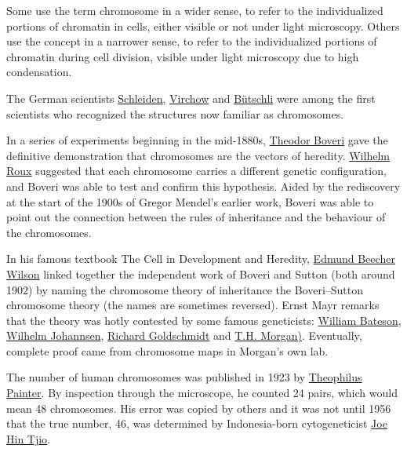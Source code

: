 Some use the term chromosome in a wider sense, to refer to the individualized portions of chromatin in cells, either visible or not under light microscopy. Others use the concept in a narrower sense, to refer to the individualized portions of chromatin during cell division, visible under light microscopy due to high condensation.

The German scientists \href{https://en.wikipedia.org/wiki/Matthias_Jakob_Schleiden}{Schleiden}, \href{https://en.wikipedia.org/wiki/Rudolf_Virchow}{Virchow} and \href{https://en.wikipedia.org/wiki/Otto_Bütschli}{Bütschli} were among the first scientists who recognized the structures now familiar as chromosomes.

In a series of experiments beginning in the mid-1880s, \href{https://en.wikipedia.org/wiki/Theodor_Boveri}{Theodor Boveri} gave the definitive demonstration that chromosomes are the vectors of heredity. \href{https://en.wikipedia.org/wiki/Wilhelm_Roux}{Wilhelm Roux} suggested that each chromosome carries a different genetic configuration, and Boveri was able to test and confirm this hypothesis. Aided by the rediscovery at the start of the 1900s of Gregor Mendel's earlier work, Boveri was able to point out the connection between the rules of inheritance and the behaviour of the chromosomes.

In his famous textbook The Cell in Development and Heredity, \href{https://en.wikipedia.org/wiki/Edmund_Beecher_Wilson}{Edmund Beecher Wilson} linked together the independent work of Boveri and Sutton (both around 1902) by naming the chromosome theory of inheritance the Boveri--Sutton chromosome theory (the names are sometimes reversed). Ernst Mayr remarks that the theory was hotly contested by some famous geneticists: \href{https://en.wikipedia.org/wiki/William_Bateson}{William Bateson}, \href{https://en.wikipedia.org/wiki/Wilhelm_Johannsen}{Wilhelm Johannsen}, \href{https://en.wikipedia.org/wiki/Richard_Goldschmidt}{Richard Goldschmidt} and \href{https://en.wikipedia.org/wiki/Thomas_Hunt_Morgan}{T.H. Morgan)}. Eventually, complete proof came from chromosome maps in Morgan's own lab.

The number of human chromosomes was published in 1923 by \href{https://en.wikipedia.org/wiki/Theophilus_Painter}{Theophilus Painter}. By inspection through the microscope, he counted 24 pairs, which would mean 48 chromosomes. His error was copied by others and it was not until 1956 that the true number, 46, was determined by Indonesia-born cytogeneticist \href{https://en.wikipedia.org/wiki/Joe_Hin_Tjio}{Joe Hin Tjio}.

